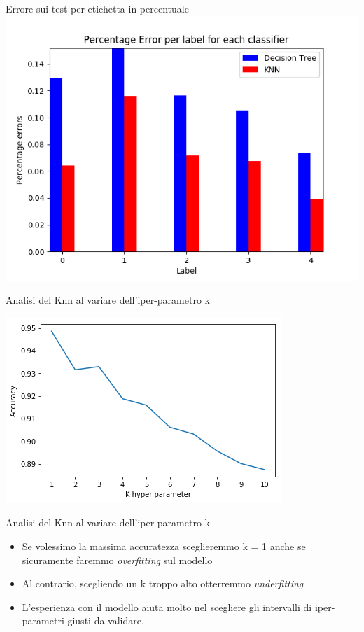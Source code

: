 \documentclass[11pt]{beamer}
\begin{document}
	\begin{frame}{Errore sui test per etichetta in percentuale}
		\includegraphics[width=1\linewidth]{img/test_error_per_label_percentage}
	\end{frame}
	\begin{frame}{Analisi del Knn al variare dell'iper-parametro k}
		\begin{center}
			\includegraphics[width=1\linewidth]{img/accuracy_knn}
		\end{center}
	\end{frame}
	\begin{frame}{Analisi del Knn al variare dell'iper-parametro k}
		\begin{itemize}
			\item Se volessimo la massima accuratezza sceglieremmo k = 1 anche se sicuramente faremmo \textit{overfitting} sul modello
			\item Al contrario, scegliendo un k troppo alto otterremmo \textit{underfitting}
			\item L'esperienza con il modello aiuta molto nel scegliere gli intervalli di iper-parametri giusti da validare.
		\end{itemize}
	\end{frame}
\end{document}
